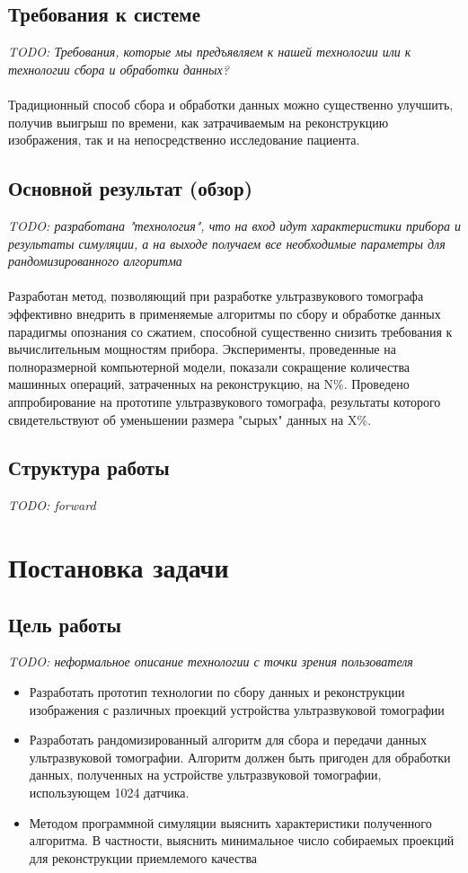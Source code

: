 \documentclass[14pt]{matmex-diploma}
\begin{document}
\subsection{Требования к системе}
\textit{TODO: Требования, которые мы предъявляем к нашей технологии или к технологии сбора и обработки данных?} \\
\\
Традиционный способ сбора и обработки данных можно существенно улучшить, получив выигрыш по времени, как затрачиваемым на реконструкцию изображения, так и на непосредственно исследование пациента.

\subsection{Основной результат (обзор)}
\textit{TODO: разработана "технология", что на вход идут характеристики прибора и результаты симуляции, а на выходе получаем все необходимые параметры для рандомизированного алгоритма} \\
\\
Разработан метод, позволяющий при разработке ультразвукового томографа эффективно внедрить в применяемые алгоритмы по сбору и обработке данных парадигмы опознания со сжатием, способной существенно снизить требования к вычислительным мощностям прибора. Эксперименты, проведенные на полноразмерной компьютерной модели, показали сокращение количества машинных операций, затраченных на реконструкцию, на N\%. Проведено аппробирование на прототипе ультразвукового томографа, результаты которого свидетельствуют об уменьшении размера "сырых" данных на X\%. 

\subsection{Структура работы}
\textit{TODO: forward} \\

\section{Постановка задачи}
\subsection{Цель работы}
\textit{TODO: неформальное описание технологии с точки зрения пользователя} \\
\begin{itemize}
  \item Разработать прототип технологии по сбору данных и реконструкции изображения с различных проекций устройства ультразвуковой томографии
  \item Разработать рандомизированный алгоритм для сбора и передачи данных ультразвуковой томографии. Алгоритм должен быть пригоден для обработки данных, полученных на устройстве ультразвуковой томографии, использующем 1024 датчика.  
  \item Методом программной симуляции выяснить характеристики полученного алгоритма. В частности, выяснить минимальное число собираемых проекций для реконструкции приемлемого качества
\end{itemize}
\end{document}
